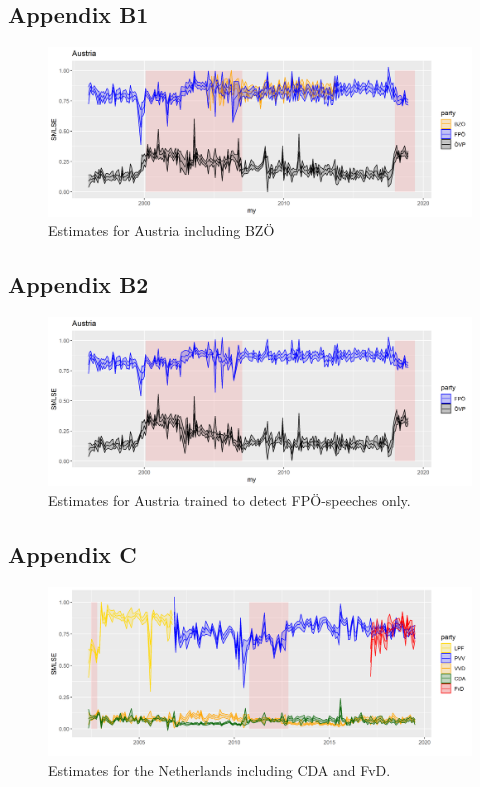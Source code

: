 \documentclass{article}
\begin{document}
\subsection*{Appendix B1}
\begin{figure}[ht!]
    \centering
    \includegraphics[width=\textwidth]{AT/vis/AT_fpvpbz_paper.png}
    \caption{Estimates for Austria including BZÖ}
    \label{fig:bzoe}
\end{figure}

\subsection*{Appendix B2}
\begin{figure}[ht!]
    \centering
    \includegraphics[width=\textwidth]{AT/vis/AT_fpvp_fpest_paper.png}
    \caption{Estimates for Austria trained to detect FPÖ-speeches only.}
    \label{fig:fponly}
\end{figure}


\subsection*{Appendix C}


\begin{figure}[ht!]
    \centering
    \includegraphics[width=\textwidth]{NL/vis/nl_vvd_cda_rr.png}
    \caption{Estimates for the Netherlands including CDA and FvD.}
    \label{fig:cda}
\end{figure}
\end{document}

